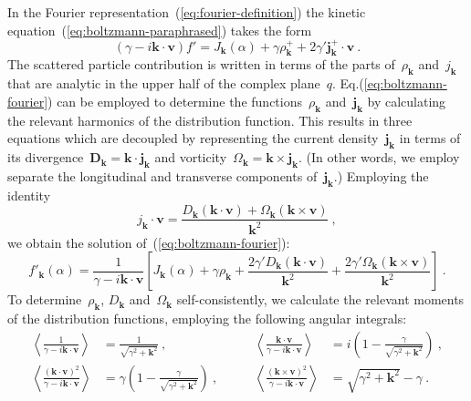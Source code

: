 \documentclass[preprint,aps,eqsecnum]{revtex4-1}
\newcommand{\fplus}[1]{{#1}^{+}}
\begin{document}
In the Fourier representation~(\ref{eq:fourier-definition}) the kinetic
equation~(\ref{eq:boltzmann-paraphrased}) takes the form
\begin{equation}
  \label{eq:boltzmann-fourier}
  (\gamma - i {\bm k} \cdot {\bm v}) f' = J_{\bm k}(\alpha)
    +   \gamma \fplus{\rho}_{\bm k}
    + 2 \gamma' \fplus{\bm j}_{\bm k} \cdot {\bm v}
\ .
\end{equation}
The scattered particle contribution is written in terms of
the parts of~$\rho_{\bm k}$ and~$j_{\bm k}$ that are analytic in the
upper half of the complex plane~$q$. Eq.(\ref{eq:boltzmann-fourier})
can be employed to determine
the functions~$\rho_{\bm k}$ and~${\bm j}_{\bm k}$ by calculating the
relevant harmonics of the distribution function. This results in three
equations which are decoupled by representing the
current density~${\bm j}_{\bm k}$ in terms of its
divergence~${\bm D}_{\bm k} = {\bm k}\cdot{\bm j}_{\bm k}$
and vorticity~$\Omega_{\bm k} = {\bm k} \times {\bm j}_{\bm k}$.
(In other words, we employ separate the longitudinal and transverse
components of~${\bm j}_{\bm k}$.)
Employing the identity
\begin{equation}
  \label{eq:current-identity}
  j_{\bm k} \cdot {\bm v} = \frac{D_{\bm k} ({\bm k} \cdot {\bm v})
    + \Omega_{\bm k} ({\bm k} \times {\bm v}) }{{\bm k}^2}
\ ,
\end{equation}
we obtain the solution of~(\ref{eq:boltzmann-fourier}):
\begin{equation}
  f'_{\bm k}(\alpha) = \frac{1}{\gamma - i {\bm k} \cdot{\bm v}}
  \left[ J_{\bm k}(\alpha) + \gamma\rho_{\bm k}
+   \frac{2 \gamma' D_{\bm k} ({\bm k} \cdot {\bm v})}{{\bm k}^2}
+  \frac{2 \gamma' \Omega_{\bm k} ({\bm k} \times {\bm v})}{{\bm k}^2}
  \right]
  \ .
\end{equation}
To determine~$\rho_{\bm k}$, $D_{\bm k}$ and~$\Omega_{\bm k}$
self-consistently, we calculate the relevant moments of the distribution
functions, employing the following angular integrals:
\begin{align}
  \label{eq:angular-integrals}
  \left\langle
      \frac{1}{\gamma -i {\bm k} \cdot {\bm v}}
  \right\rangle
  &= \frac{1}{\sqrt{\gamma^2 + {\bm k}^2}}
  \ , \qquad
  &\left\langle
     \frac{{\bm k}\cdot{\bm v}}{\gamma -i {\bm k} \cdot {\bm v}}
  \right\rangle
  &= i \left(1 - \frac{\gamma}{\sqrt{\gamma^2 + {\bm k}^2}}\right)
  \ ,
\\
  \left\langle
      \frac{({\bm k}\cdot{\bm v})^2}{\gamma -i {\bm k} \cdot {\bm v}}
  \right\rangle
  &= \gamma \left(1 - \frac{\gamma}{\sqrt{\gamma^2 + {\bm k}^2}}\right) \ ,
  \qquad
  &\left\langle
     \frac{\left({\bm k}\times{\bm v}\right)^2}{\gamma -i {\bm k} \cdot {\bm v}}
  \right\rangle
  &=\sqrt{\gamma^2 + {\bm k}^2} - \gamma \ .
\nonumber
\end{align}
\end{document}

